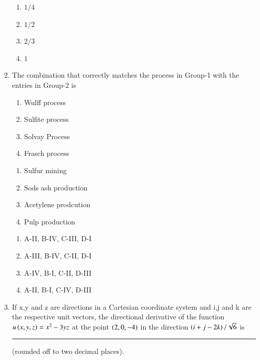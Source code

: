 \documentclass[journal,12pt,onecolumn]{IEEEtran}
\theoremstyle{remark}
\begin{document}
\begin{enumerate}
    
\begin{multicols}{4}
    \begin{enumerate}
        \item $1/4$
        \item $1/2$
        \item $2/3$
        \item $1$
    \end{enumerate}
\end{multicols}

    \item 
        The combination that correctly matches the process in Group-1 with the entries in Group-2 is
    

\begin{multicols}{2}
    \begin{enumerate}[label = \Alph*)]
        \item Wulff process
        \item Sulfite process
        \item Solvay Process
        \item Frasch process
    \end{enumerate}
\columnbreak
    \begin{enumerate}[label = \Roman*)]
        \item Sulfur mining
        \item Sods ash production 
        \item Acetylene prodcution
        \item Pulp production
    \end{enumerate}
\end{multicols}
\begin{multicols}{2}
    \begin{enumerate}
        \item A-II, B-IV, C-III, D-I
        \item A-III, B-IV, C-II, D-I
        \item A-IV, B-I, C-II, D-III
        \item A-II, B-I, C-IV, D-III
    \end{enumerate}
\end{multicols}

    \item If x,y and z are directions in a Cartesian coordinate system and i,j and k are the respective unit vectors, the directional derivative of the function $u\left(x,y,z\right) = x^2 - 3yz$ at the point $\left(2, 0,-4\right)$ in the direction $\left(i+j-2k\right)/\sqrt{6}$ is \rule{2cm}{0.1mm} (rounded off to two decimal places).


\end{enumerate}
\end{document}
